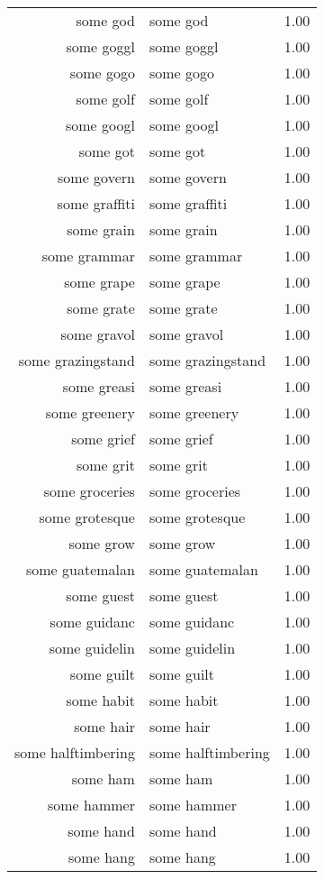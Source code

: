 \begin{table}[ht]
\begin{tabular}{rlr}
  some god & some god & 1.00 \\ 
  some goggl & some goggl & 1.00 \\ 
  some gogo & some gogo & 1.00 \\ 
  some golf & some golf & 1.00 \\ 
  some googl & some googl & 1.00 \\ 
  some got & some got & 1.00 \\ 
  some govern & some govern & 1.00 \\ 
  some graffiti & some graffiti & 1.00 \\ 
  some grain & some grain & 1.00 \\ 
  some grammar & some grammar & 1.00 \\ 
  some grape & some grape & 1.00 \\ 
  some grate & some grate & 1.00 \\ 
  some gravol & some gravol & 1.00 \\ 
  some grazingstand & some grazingstand & 1.00 \\ 
  some greasi & some greasi & 1.00 \\ 
  some greenery & some greenery & 1.00 \\ 
  some grief & some grief & 1.00 \\ 
  some grit & some grit & 1.00 \\ 
  some groceries & some groceries & 1.00 \\ 
  some grotesque & some grotesque & 1.00 \\ 
  some grow & some grow & 1.00 \\ 
  some guatemalan & some guatemalan & 1.00 \\ 
  some guest & some guest & 1.00 \\ 
  some guidanc & some guidanc & 1.00 \\ 
  some guidelin & some guidelin & 1.00 \\ 
  some guilt & some guilt & 1.00 \\ 
  some habit & some habit & 1.00 \\ 
  some hair & some hair & 1.00 \\ 
  some halftimbering & some halftimbering & 1.00 \\ 
  some ham & some ham & 1.00 \\ 
  some hammer & some hammer & 1.00 \\ 
  some hand & some hand & 1.00 \\ 
  some hang & some hang & 1.00 \\ 

\end{tabular}
\end{table}
